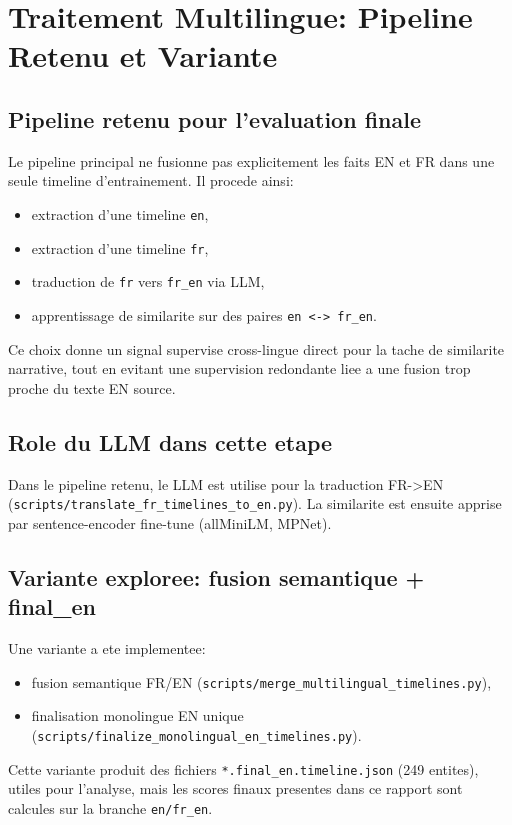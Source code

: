 ﻿\chapter{Traitement Multilingue: Pipeline Retenu et Variante}

\section{Pipeline retenu pour l'evaluation finale}
Le pipeline principal ne fusionne pas explicitement les faits EN et FR dans une
seule timeline d'entrainement. Il procede ainsi:
\begin{itemize}[leftmargin=2em]
  \item extraction d'une timeline \texttt{en},
  \item extraction d'une timeline \texttt{fr},
  \item traduction de \texttt{fr} vers \texttt{fr\_en} via LLM,
  \item apprentissage de similarite sur des paires \texttt{en <-> fr\_en}.
\end{itemize}

Ce choix donne un signal supervise cross-lingue direct pour la tache de
similarite narrative, tout en evitant une supervision redondante liee a une
fusion trop proche du texte EN source.

\section{Role du LLM dans cette etape}
Dans le pipeline retenu, le LLM est utilise pour la traduction FR->EN
(\texttt{scripts/translate\_fr\_timelines\_to\_en.py}).
La similarite est ensuite apprise par sentence-encoder fine-tune
(allMiniLM, MPNet).

\section{Variante exploree: fusion semantique + final\_en}
Une variante a ete implementee:
\begin{itemize}[leftmargin=2em]
  \item fusion semantique FR/EN (\texttt{scripts/merge\_multilingual\_timelines.py}),
  \item finalisation monolingue EN unique (\texttt{scripts/finalize\_monolingual\_en\_timelines.py}).
\end{itemize}

Cette variante produit des fichiers \texttt{*.final\_en.timeline.json}
(249 entites), utiles pour l'analyse, mais les scores finaux presentes dans ce
rapport sont calcules sur la branche \texttt{en/fr\_en}.
